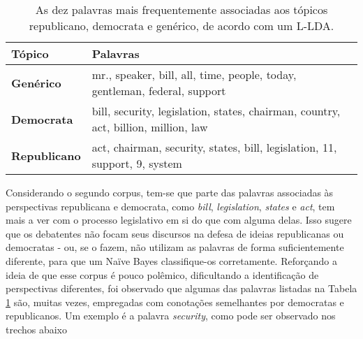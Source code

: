
\begin{table}[h]
\label{freqs:tab2}
\centering
\begin{tabular}{| l | p{10cm} | }
\hline
\textbf{Tópico} & \textbf{Palavras} \\ \hline
\textbf{Genérico} & mr., speaker, bill, all, time, people, today, gentleman, federal, support \\ \hline
\textbf{Democrata} & bill, security, legislation, states, chairman, country, act, billion, million, law \\ \hline
\textbf{Republicano} & act, chairman, security, states, bill, legislation, 11, support, 9, system \\ \hline
\end{tabular}
\caption{As dez palavras mais frequentemente associadas aos tópicos republicano, democrata e genérico, de acordo com um L-LDA.}
\end{table}



Considerando o segundo corpus, tem-se que parte das palavras associadas às perspectivas republicana e democrata, como \emph{bill}, \emph{legislation}, \emph{states} e \emph{act}, tem mais a ver com o processo legislativo em si do que com alguma delas. Isso sugere que os debatentes não focam seus discursos na defesa de ideias republicanas ou democratas - ou, se o fazem, não utilizam as palavras de forma suficientemente diferente,  para que um Naïve Bayes classifique-os corretamente. Reforçando a ideia de que esse corpus é pouco polêmico, dificultando a identificação de perspectivas diferentes, foi observado que algumas das palavras listadas na Tabela \ref{freqs:tab2} são, muitas vezes, empregadas com conotações semelhantes por democratas e republicanos. Um exemplo é a palavra \emph{security}, como pode ser observado nos trechos abaixo

